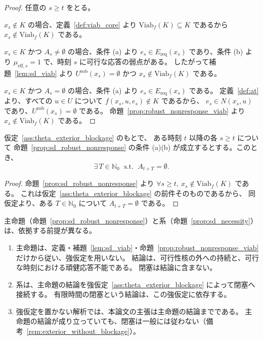 \begin{proof}
任意の $s\ge t$ をとる。

$x_s\notin K$ の場合、定義~\ref{def:viab_core} より
$\mathrm{Viab}_f(K)\subseteq K$ であるから
$x_s\notin\mathrm{Viab}_f(K)$ である。

$x_s\in K$ かつ $A_s\neq\emptyset$ の場合、条件 (a) より
$e_s\in E_{\mathrm{req}}(x_s)$ であり、条件 (b) より
$\mu_{\mathrm{eff},s}=1$ で、時刻 $s$ に可行な応答の弱点がある。
したがって補題~\ref{lem:sd_viab} より
$U^{\mathrm{rob}}(x_s)=\emptyset$ かつ $x_s\notin\mathrm{Viab}_f(K)$ である。

$x_s\in K$ かつ $A_s=\emptyset$ の場合、条件 (a) より
$e_s\in E_{\mathrm{req}}(x_s)$ である。
定義~\ref{def:at} より、すべての $u\in U$ について $f(x_s,u,e_s)\notin K$ であるから、
$e_s\in N(x_s,u)$ であり、$U^{\mathrm{rob}}(x_s)=\emptyset$ である。
命題~\ref{prop:robust_nonresponse_viab} より $x_s\notin\mathrm{Viab}_f(K)$ である。
\end{proof}

\begin{proposition}
\label{prop:sd_necessity}
仮定~\ref{ass:theta_exterior_blockage} のもとで、
ある時刻 $t$ 以降の各 $s\ge t$ について
命題~\ref{prop:sd_robust_nonresponse} の条件 (a)(b) が成立するとする。このとき、
\[
  \exists\,T\in\mathbb{N}_0
  \;\text{ s.t. }\;
  A_{t+T}=\emptyset.
\]
\end{proposition}

\begin{proof}
命題~\ref{prop:sd_robust_nonresponse} より
$\forall s\ge t,\ x_s\notin\mathrm{Viab}_f(K)$ である。
これは仮定~\ref{ass:theta_exterior_blockage} の前件そのものであるから、
同仮定より、ある $T\in\mathbb{N}_0$ について $A_{t+T}=\emptyset$ である。
\end{proof}

\begin{remark}[主命題と系の役割分担]
\label{rem:sd_role_division}
主命題（命題~\ref{prop:sd_robust_nonresponse}）と系（命題~\ref{prop:sd_necessity}）は、依拠する前提が異なる。
\begin{enumerate}
  \item 主命題は、定義・補題~\ref{lem:sd_viab}・命題~\ref{prop:robust_nonresponse_viab} だけから従い、強仮定を用いない。
  結論は、可行性核の外への持続と、可行な時刻における頑健応答不能である。
  閉塞は結論に含まない。
  \item 系は、主命題の結論を強仮定~\ref{ass:theta_exterior_blockage} によって閉塞へ接続する。
  有限時間の閉塞という結論は、この強仮定に依存する。
  \item 強仮定を置かない解析では、本論文の主張は主命題の結論までである。
  主命題の結論が成り立っていても、閉塞は一般には従わない（備考~\ref{rem:exterior_without_blockage}）。
\end{enumerate}
\end{remark}

